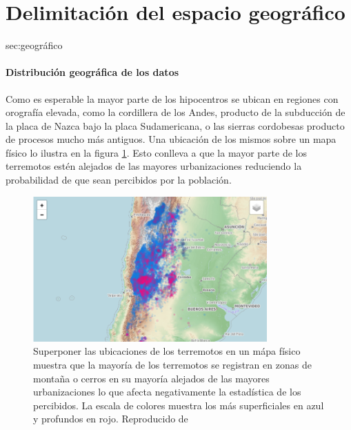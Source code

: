 \documentclass[a4paper]{report}
\begin{document}
\section{Delimitación del espacio geográfico}{sec:geográfico}

\paragraph{Distribución geográfica de los datos}
Como es esperable la mayor parte de los hipocentros se ubican en regiones con orografía elevada, como la cordillera de los Andes, producto de la subducción de la placa de Nazca bajo la placa Sudamericana, o las sierras cordobesas producto de procesos mucho más antiguos. 
Una ubicación de los mismos sobre un mapa físico lo ilustra en la figura \ref{fig:mapa_sismos}.
Esto conlleva a que la mayor parte de los terremotos estén alejados de las mayores urbanizaciones reduciendo la probabilidad de que sean percibidos por la población.
\begin{figure}[!ht]
\centering
\includegraphics[width=0.8\textwidth]{mapa_sismos.png}
\caption{Superponer las ubicaciones de los terremotos en un mápa físico muestra que la mayoría de los terremotos se registran en zonas de montaña o cerros en su mayoría alejados de las mayores urbanizaciones lo que afecta negativamente la estadística de los percibidos.
La escala de colores muestra los más superficiales en azul y profundos en rojo.
Reproducido de \cite{daniela_parada_ic-datasets-docencia_nodate}}
\label{fig:mapa_sismos}
\end{figure}
\end{document}

